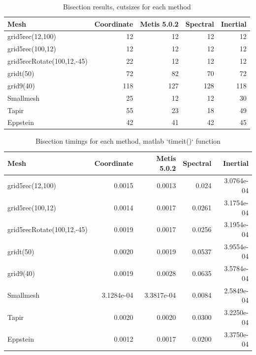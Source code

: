 \documentclass[unicode,11pt,a4paper,oneside,numbers=endperiod,openany]{scrartcl}
\begin{document}
\begin{table}[H]
    \caption{Bisection results, cutsizes for each method}
    \centering
    \begin{tabular}{l|r|r|r|r} \hline\hline
        Mesh                       & Coordinate & Metis 5.0.2 & Spectral & Inertial \\ \hline
        grid5rec(12,100)           & 12         & 12          & 12       & 12       \\
        grid5rec(100,12)           & 12         & 12          & 12       & 12       \\
        grid5recRotate(100,12,-45) & 22         & 12          & 12       & 12       \\
        gridt(50)                  & 72         & 82          & 70       & 72       \\
        grid9(40)                  & 118        & 127         & 128      & 118      \\
        Smallmesh                  & 25         & 12          & 12       & 30       \\
        Tapir                      & 55         & 23          & 18       & 49       \\
        Eppstein                   & 42         & 41          & 42       & 45       \\
        \hline \hline
    \end{tabular}
    \label{table:bisection}
\end{table}

\begin{table}[H]
    \caption{Bisection timings for each method, matlab `timeit()` function}
    \centering
    \begin{tabular}{l|r|r|r|r} \hline\hline
        Mesh                       & Coordinate & Metis 5.0.2 & Spectral & Inertial   \\ \hline
        grid5rec(12,100)           & 0.0015     & 0.0013      & 0.024    & 3.0764e-04 \\
        grid5rec(100,12)           & 0.0014     & 0.0017      & 0.0261   & 3.1754e-04 \\
        grid5recRotate(100,12,-45) & 0.0019     & 0.0017      & 0.0256   & 3.1954e-04 \\
        gridt(50)                  & 0.0020     & 0.0019      & 0.0537   & 3.9554e-04 \\
        grid9(40)                  & 0.0019     & 0.0028      & 0.0635   & 3.5784e-04 \\
        Smallmesh                  & 3.1284e-04 & 3.3817e-04  & 0.0084   & 2.5849e-04 \\
        Tapir                      & 0.0020     & 0.0020      & 0.0300   & 3.2250e-04 \\
        Eppstein                   & 0.0012     & 0.0017      & 0.0200   & 3.3750e-04 \\
        \hline \hline
    \end{tabular}
    \label{table:bisection-timings}
\end{table}
\end{document}
